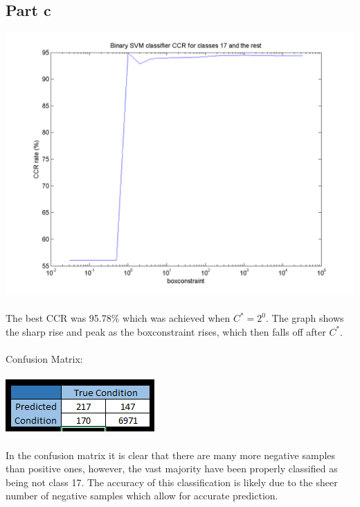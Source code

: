 \documentclass[paper=a4, fontsize=11pt]{scrartcl} %
\numberwithin{equation}{section} %
\numberwithin{figure}{section} %
\numberwithin{table}{section} %
\begin{document}
	\subsection{Part c}
	\includegraphics[scale=0.8]{part_c_CV_CCR}
	\\\\
	The best CCR was 95.78\% which was achieved when $C^* = 2^0$. The graph shows the sharp rise and peak as the boxconstraint rises, which then falls off after $C^*$.
	\\\\
	Confusion Matrix:
	\\\\
	\hspace*{3.5cm}\includegraphics{part_c_confusion_matrix}
	\\\\
	In the confusion matrix it is clear that there are many more negative samples than positive ones, however, the vast majority have been properly classified as being not class 17. The accuracy of this classification is likely due to the sheer number of negative samples which allow for accurate prediction.
	
	\newpage
\end{document}
